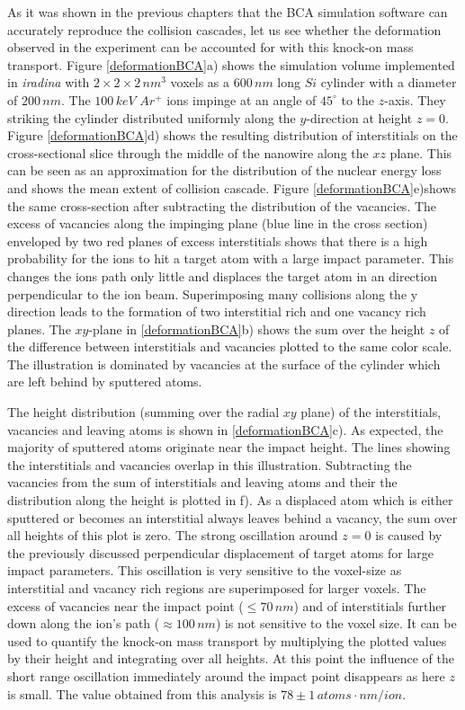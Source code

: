 \documentclass[12pt,
paper=a4,				
DIV=calc,		  %
BCOR=16mm,	  %
headinclude,
openany
]{scrbook}
\begin{document}
As it was shown in the previous chapters that the BCA simulation software can accurately reproduce the collision cascades, let us see whether the deformation observed in the experiment can be accounted for with this knock-on mass transport. Figure \ref{deformationBCA}a) shows the simulation volume implemented in \emph{iradina} with $2\times2\times2\,nm^3$ voxels as a $600\,nm$ long $Si$ cylinder with a diameter of $200\,nm$. The $100\,keV\,\,Ar^+$ ions impinge at an angle of $45^\circ$ to the $z$-axis. They striking the cylinder distributed uniformly along the $y$-direction at height $z=0$. Figure \ref{deformationBCA}d) shows the resulting distribution of interstitials on the cross-sectional slice through the middle of the nanowire along the $xz$ plane. This can be seen as an approximation for the distribution of the nuclear energy loss and shows the mean extent of collision cascade. Figure \ref{deformationBCA}e)shows the same cross-section after subtracting the distribution of the vacancies. The excess of vacancies along the impinging plane (blue line in the cross section) enveloped by two red planes of excess interstitials shows that there is a high probability for the ions to hit a target atom with a large impact parameter. This changes the ions path only little and displaces the target atom in an direction perpendicular to the ion beam. Superimposing many collisions along the y direction leads to the formation of two interstitial rich and one vacancy rich planes. The $xy$-plane in \ref{deformationBCA}b) shows the sum over the height $z$ of the difference between interstitials and vacancies plotted to the same color scale. The illustration is dominated by vacancies at the surface of the cylinder which are left behind by sputtered atoms. 

The height distribution (summing over the radial $xy$ plane) of the interstitials, vacancies and leaving atoms is shown in \ref{deformationBCA}c). As expected, the majority of sputtered atoms originate near the impact height. The lines showing the interstitials and vacancies overlap in this illustration. Subtracting the vacancies from the sum of interstitials and leaving atoms and their the distribution along the height is plotted in f). As a displaced atom which is either sputtered or becomes an interstitial always leaves behind a vacancy, the sum over all heights of this plot is zero. The strong oscillation around $z=0$ is caused by the previously discussed perpendicular displacement of target atoms for large impact parameters. This oscillation is very sensitive to the voxel-size as interstitial and vacancy rich regions are superimposed for larger voxels. The excess of vacancies near the impact point ($\le 70\,nm$) and of interstitials further down along the ion's path ($\approx 100\,nm$) is not sensitive to the voxel size. It can be used to quantify the knock-on mass transport by multiplying the plotted values by their height and integrating over all heights. At this point the influence of the short range oscillation immediately around the impact point disappears as here $z$ is small. The value obtained from this analysis is $78\pm1\,atoms \cdot nm /ion$.
\end{document}
